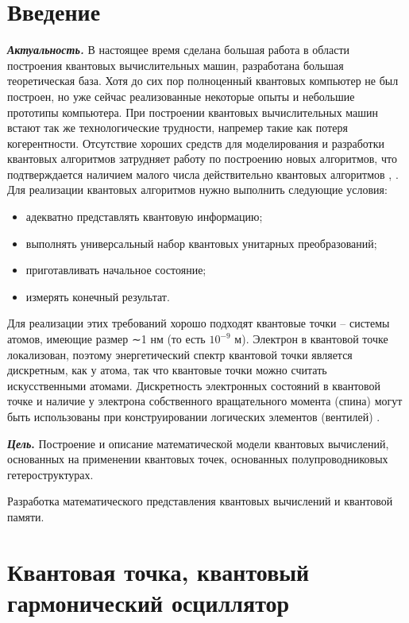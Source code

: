 \documentclass[14pt,a4paper]{PhDthesis}
\begin{document}
\section*{Введение}
\textbf{\textit{Актуальность.}} В настоящее время сделана большая работа в области построения квантовых вычислительных машин, разработана большая теоретическая база. Хотя до сих пор полноценный квантовых компьютер не был построен, но уже сейчас реализованные некоторые опыты и небольшие прототипы компьютера. При построении квантовых вычислительных машин встают так же технологические трудности, напремер такие как потеря когерентности. Отсутствие хороших средств для моделирования и разработки квантовых алгоритмов затрудняет работу по построению новых алгоритмов, что подтверждается наличием малого числа действительно квантовых алгоритмов \cite{Omer:2003}, \cite{Vizzotto:2010}. Для реализации квантовых алгоритмов нужно выполнить следующие условия:
\begin{itemize}
  \item адекватно представлять квантовую информацию; 
 
  \item выполнять универсальный набор квантовых унитарных преобразований;

  \item приготавливать начальное состояние;
  
  \item измерять конечный результат.
\end{itemize}
Для реализации этих требований хорошо подходят квантовые точки – системы атомов, имеющие размер ∼1 нм (то есть $10^{-9}$ м). Электрон в квантовой точке локализован, поэтому энергетический спектр квантовой точки является дискретным, как
у атома, так что квантовые точки можно считать искусственными атомами. Дискретность электронных состояний в квантовой точке и наличие у электрона собственного вращательного момента (спина) могут быть использованы при конструировании логических элементов
(вентилей) \cite{Sarma:2005}.

\textbf{\textit{Цель}.} Построение и описание математической модели квантовых вычислений, основанных на применении квантовых точек, основанных полупроводниковых гетероструктурах.

Разработка математического представления квантовых вычислений и квантовой памяти.


\section{Квантовая точка, квантовый гармонический осциллятор}
\end{document}
